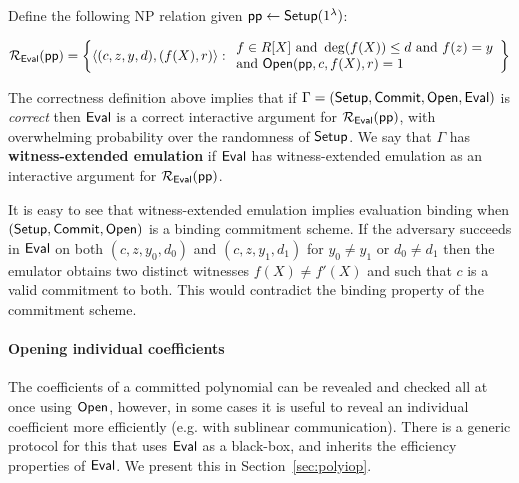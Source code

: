 \documentclass{article}
\theoremstyle{definition}
\begin{document}
Define the following NP relation given $\textsf{pp} \leftarrow \textsf{{Setup}}(1^\lambda)$: 

\[ 
\mathcal{R_\textsf{Eval}}(\textsf{pp}) = \left\{
\langle (c, z, y, d), (f(X), r) \rangle
: 
\begin{array}{l} 
f \in R[X] \ \text{and} \ \deg(f(X)) \leq d \ \text{and} \ f(z) = y \\ 
 \text{and} \ \textsf{{Open}}(\textsf{pp}, c, f(X), r) = 1 \\
\end{array}
\right\}
\] 

The correctness definition above implies that if $\Gamma = (\textsf{{Setup}}, \textsf{{Commit}}, \textsf{{Open}}, \textsf{{Eval}})$ is \emph{correct} then $\textsf{{Eval}}$ is a correct interactive argument for $\mathcal{R_\textsf{Eval}}(\textsf{pp})$, with overwhelming probability over the randomness of $\textsf{{Setup}}$. We say that $\Gamma$ has \textbf{witness-extended emulation} if $\textsf{{Eval}}$ has witness-extended emulation as an interactive argument for $\mathcal{R_\textsf{Eval}}(\textsf{pp})$. 

It is easy to see that witness-extended emulation implies evaluation binding when $(\textsf{{Setup}}, \textsf{{Commit}}, \textsf{{Open}})$ is a binding commitment scheme. If the adversary succeeds in $\textsf{{Eval}}$ on both $(c, z, y_0, d_0)$ and $(c, z, y_1, d_1)$ for $y_0 \neq y_1$ or $d_0 \neq d_1$ then the emulator obtains two distinct witnesses $f(X) \neq f'(X)$ and such that $c$ is a valid commitment to both. This would contradict the binding property of the commitment scheme. 

\paragraph{Opening individual coefficients} The coefficients of a committed polynomial can be revealed and checked all at once using $\textsf{{Open}}$, however, in some cases it is useful to reveal an individual coefficient more efficiently (e.g. with sublinear communication). 
There is a generic protocol for this that uses $\textsf{{Eval}}$ as a black-box, and inherits the efficiency properties of $\textsf{{Eval}}$. We present this in Section~\ref{sec:polyiop}. 


\end{document}
